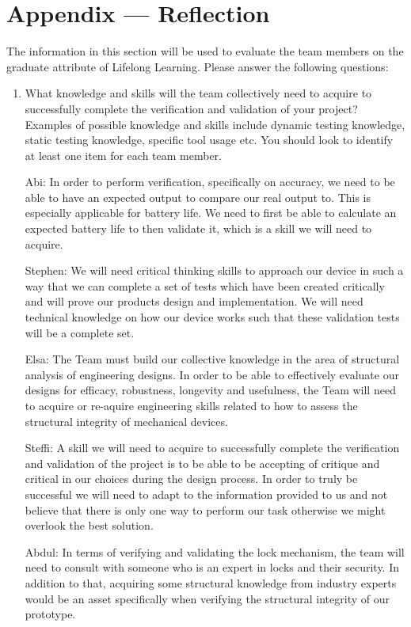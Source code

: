 \documentclass[12pt, titlepage]{article}
\begin{document}
\newpage{}
\section*{Appendix --- Reflection}

The information in this section will be used to evaluate the team members on the
graduate attribute of Lifelong Learning.  Please answer the following questions:

\begin{enumerate}
  \item What knowledge and skills will the team collectively need to acquire to
  successfully complete the verification and validation of your project?
  Examples of possible knowledge and skills include dynamic testing knowledge,
  static testing knowledge, specific tool usage etc.  You should look to
  identify at least one item for each team member.

Abi: In order to perform verification, specifically on accuracy, we need to be able to have an expected output to compare our real output to. This is especially applicable for battery life. We need to first be able to calculate an expected battery life to then validate it, which is a skill we will need to acquire. 

Stephen: We will need critical thinking skills to approach our device in such a way that we can complete a set of tests which have been created critically and will prove our products design and implementation. We will need technical knowledge on how our device works such that these validation tests will be a complete set.

Elsa: The Team must build our collective knowledge in the area of structural analysis of engineering designs. In order to be able to effectively evaluate our designs for efficacy, robustness, longevity and usefulness, the Team will need to acquire or re-aquire engineering skills related to how to assess the structural integrity of mechanical devices.

Steffi: A skill we will need to acquire to successfully complete the verification and validation of the project is to be able to be accepting of critique and critical in our choices during the design process.  In order to truly be successful we will need to adapt to the information provided to us and not believe that there is only one way to perform our task otherwise we might overlook the best solution.

Abdul: In terms of verifying and validating the lock mechanism, the team will need to consult with someone who is an expert in locks and their security. In addition to that, acquiring some structural knowledge from industry experts would be an asset specifically when verifying the structural integrity of our prototype. 


\end{enumerate}
\end{document}
